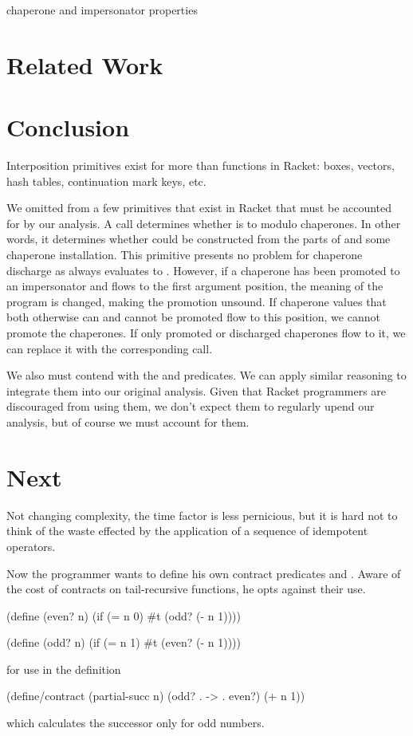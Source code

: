 \documentclass{sigplanconf}
\begin{document}
chaperone and impersonator properties

\section{Related Work}

\section{Conclusion}

Interposition primitives exist for more than functions in Racket: boxes, vectors, hash tables, continuation mark keys, etc.

We omitted from \chapcalc a few primitives that exist in Racket that must be accounted for by our analysis.
A call  determines whether  is  to  modulo chaperones.
In other words, it determines whether  could be constructed from the parts of  and some chaperone installation.
This primitive presents no problem for chaperone discharge as  always evaluates to .
However, if a chaperone has been promoted to an impersonator and flows to the first argument position, the meaning of the program is changed, making the promotion unsound.
If chaperone values that both otherwise can and cannot be promoted flow to this position, we cannot promote the chaperones.
If only promoted or discharged chaperones flow to it, we can replace it with the corresponding  call.

We also must contend with the  and  predicates. We can apply similar reasoning to integrate them into our original analysis.
Given that Racket programmers are discouraged from using them, we don't expect them to regularly upend our analysis, but of course we must account for them.

\section{Next}

Not changing complexity, the time factor is less pernicious, but it is hard not to think of the waste effected by the application of a sequence of idempotent operators.

Now the programmer wants to define his own contract predicates  and . Aware of the cost of contracts on tail-recursive functions, he opts against their use.
\begin{schemedisplay}
(define (even? n)
  (if (= n 0)
      #t
      (odd? (- n 1))))
      
(define (odd? n)
  (if (= n 1)
      #t
      (even? (- n 1))))
\end{schemedisplay}
for use in the definition
\begin{schemedisplay}
(define/contract (partial-succ n)
  (odd? . -> . even?)
  (+ n 1))
\end{schemedisplay}
which calculates the successor only for odd numbers.
\end{document}
